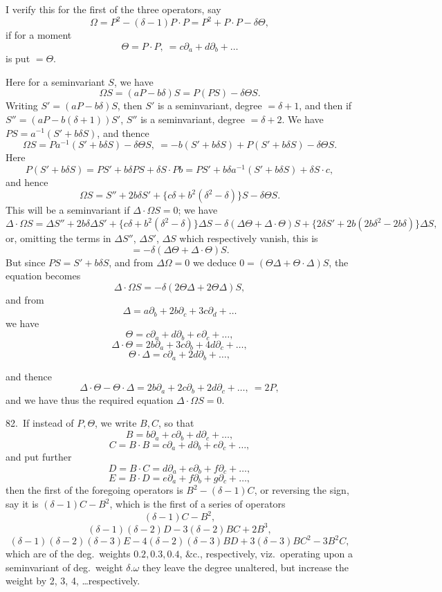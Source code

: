 \documentclass[11pt]{article}
\begin{document}
I verify this for the first of the three operators, say
\[
\Omega = P^2 - (\delta - 1) P \cdot P = P^2 + P \cdot P - \delta\Theta,
\]
if for a moment
\[
\Theta = P \cdot P,\ = c\partial_a + d\partial_b + \ldots
\]
is put $= \Theta$.

Here for a seminvariant $S$, we have
\[
\Omega S = (a P - b\delta) S = P(P S) - \delta \Theta S.
\]
Writing $S' = (aP - b\delta) S$, then $S'$ is a seminvariant, degree $= \delta + 1$, and then if $S'' = (aP - b(\delta + 1)) S'$, $S''$ is a seminvariant, degree $= \delta + 2$. We have $PS = a^{-1}(S' + b\delta S)$, and thence
\[
\Omega S = Pa^{-1}(S' + b\delta S) - \delta\Theta S,\ = -b(S' + b\delta S) + P(S' + b\delta S) - \delta\Theta S.
\]
Here
\[
P(S' + b\delta S) = PS' + b\delta PS + \delta S \cdot Pb = PS' + b\delta a^{-1}(S' + b\delta S) + \delta S \cdot c,
\]
and hence
\[
\Omega S = S'' + 2b\delta S' + \{c\delta + b^2(\delta^2 - \delta)\} S - \delta\Theta S.
\]
This will be a seminvariant if $\Delta \cdot \Omega S = 0$; we have
\[
\Delta \cdot \Omega S = \Delta S'' + 2b\delta \Delta S' + \{c\delta + b^2(\delta^2 - \delta)\}\Delta S - \delta(\Delta\Theta + \Delta \cdot \Theta) S
+ \{2\delta S' + 2b(2b\delta^2 - 2b\delta)\}\Delta S,
\]
or, omitting the terms in $\Delta S''$, $\Delta S'$, $\Delta S$ which respectively vanish, this is
\[
= -\delta(\Delta\Theta + \Delta \cdot \Theta) S.
\]
But since $PS = S' + b\delta S$, and from $\Delta\Omega = 0$ we deduce $0 = (\Theta\Delta + \Theta \cdot \Delta) S$, the equation becomes
\[
\Delta \cdot \Omega S = -\delta(2\Theta\Delta + 2\Theta\Delta) S,
\]
and from
\[
\Delta = a\partial_b + 2b\partial_c + 3c\partial_d + \ldots
\]
we have
\[
\Theta = c\partial_a + d\partial_b + e\partial_c + \ldots,
\]
\[
\Delta \cdot \Theta = 2b\partial_a + 3c\partial_b + 4d\partial_c + \ldots,
\]
\[
\Theta \cdot \Delta = c\partial_a + 2d\partial_b + \ldots,
\]

\clearpage
and thence
\[
\Delta \cdot \Theta - \Theta \cdot \Delta = 2b\partial_a + 2c\partial_b + 2d\partial_c + \ldots,\ = 2P,
\]
and we have thus the required equation $\Delta \cdot \Omega S = 0$.

82.\ If instead of $P, \Theta$, we write $B, C$, so that
\[
B = b\partial_a + c\partial_b + d\partial_c + \ldots,
\]
\[
C = B \cdot B = c\partial_a + d\partial_b + e\partial_c + \ldots,
\]
and put further
\[
D = B \cdot C = d\partial_a + e\partial_b + f\partial_c + \ldots,
\]
\[
E = B \cdot D = e\partial_a + f\partial_b + g\partial_c + \ldots,
\]
then the first of the foregoing operators is $B^2 - (\delta - 1) C$, or reversing the sign, say it is $(\delta - 1) C - B^2$, which is the first of a series of operators
\[
(\delta - 1) C - B^2,
\]
\[
(\delta - 1)(\delta - 2) D - 3(\delta - 2) BC + 2B^3,
\]
\[
(\delta - 1)(\delta - 2)(\delta - 3) E - 4(\delta - 2)(\delta - 3) BD + 3(\delta - 3) BC^2 - 3B^2 C,
\]
which are of the deg.\ weights $0.2, 0.3, 0.4$, \&c., respectively, viz.\ operating upon a seminvariant of deg.\ weight $\delta . \omega$ they leave the degree unaltered, but increase the weight by 2, 3, 4, \ldots respectively.
\end{document}
